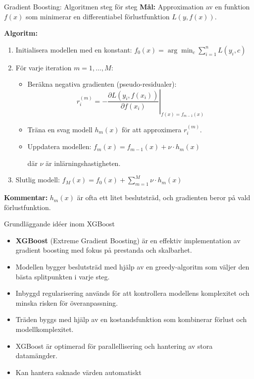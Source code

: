 \documentclass[10pt,english]{beamer}
\begin{document}
\begin{frame}{Gradient Boosting: Algoritmen steg för steg}
  \textbf{Mål:} Approximation av en funktion $f(x)$ som minimerar en differentiabel förlustfunktion $L(y, f(x))$.


  \textbf{Algoritm:}
  \begin{enumerate}
    \item Initialisera modellen med en konstant: $f_0(x) = \arg\min_c \sum_{i=1}^n L(y_i, c)$
     \vspace{0.1cm}
    \item För varje iteration $m = 1, \dots, M$:
    \begin{itemize}
      \item Beräkna negativa gradienten (pseudo-residualer):
      \[
        r_i^{(m)} = -\left.\frac{\partial L(y_i, f(x_i))}{\partial f(x_i)}\right|_{f(x) = f_{m-1}(x)}
      \]
      
      \item Träna en svag modell $h_m(x)$ för att approximera $r_i^{(m)}$.
      
      \item Uppdatera modellen: $f_m(x) = f_{m-1}(x) + \nu \cdot h_m(x)$

      där $\nu$ är inlärningshastigheten.
    \end{itemize}
     \vspace{0.1cm}
    
    \item Slutlig modell: $f_M(x) = f_0(x) + \sum_{m=1}^M \nu \cdot h_m(x)$

  \end{enumerate}

  
  \textbf{Kommentar:} $h_m(x)$ är ofta ett litet beslutsträd, och gradienten beror på vald förlustfunktion.
\end{frame}


\begin{frame}{Grundläggande idéer inom XGBoost}
  \begin{itemize}
    \item \textbf{XGBoost} (Extreme Gradient Boosting) är en effektiv implementation av gradient boosting med fokus på prestanda och skalbarhet.
    \item Modellen bygger beslutsträd med hjälp av en greedy-algoritm som väljer den bästa splitpunkten i varje steg.
    \item Inbyggd regularisering används för att kontrollera modellens komplexitet och minska risken för överanpassning.
    \item Träden byggs med hjälp av en kostandsfunktion som kombinerar förlust och modellkomplexitet.
    \item XGBoost är optimerad för parallellisering och hantering av stora datamängder.
    \item Kan hantera saknade värden automatiskt
  \end{itemize}
\end{frame}
\end{document}
